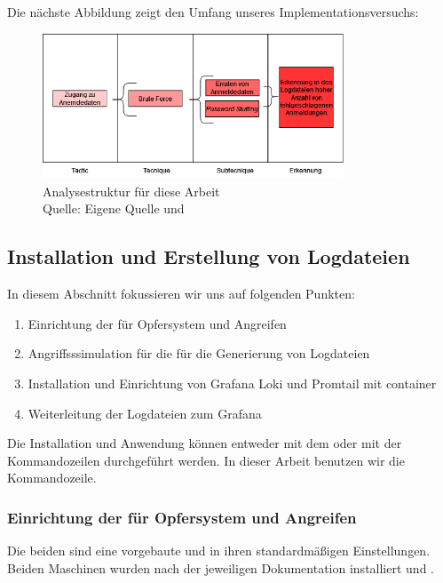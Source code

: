 Die nächste Abbildung zeigt den Umfang unseres Implementationsversuchs:
\begin{figure}[H]
   \centering
   \includegraphics[width=0.8\textwidth]{assets/T1110.drawio.png}
   \caption{Analysestruktur für diese Arbeit  \\Quelle: Eigene Quelle und \citep{Mitre_t1110}}
   \centering
\end{figure}

\newpage
\subsection{Installation und Erstellung von Logdateien}
In diesem Abschnitt fokussieren wir uns auf folgenden Punkten:

{
\begin{enumerate}[noitemsep]
   \item	Einrichtung der  für Opfersystem und Angreifen
   \item	Angriffsssimulation für die für die Generierung von Logdateien
   \item Installation und Einrichtung von Grafana Loki und Promtail mit \gls{container}
   \item Weiterleitung der Logdateien zum Grafana
\end{enumerate}
}

Die Installation und Anwendung können entweder mit dem  oder mit der Kommandozeilen durchgeführt werden. In dieser Arbeit benutzen wir die Kommandozeile. 

\subsubsection{Einrichtung der  für Opfersystem und Angreifen}
Die beiden  sind eine vorgebaute  und  in ihren standardmäßigen Einstellungen. Beiden Maschinen wurden nach der jeweiligen Dokumentation installiert \citep{kali_vm} und \citep{Ubuntu_server}.

